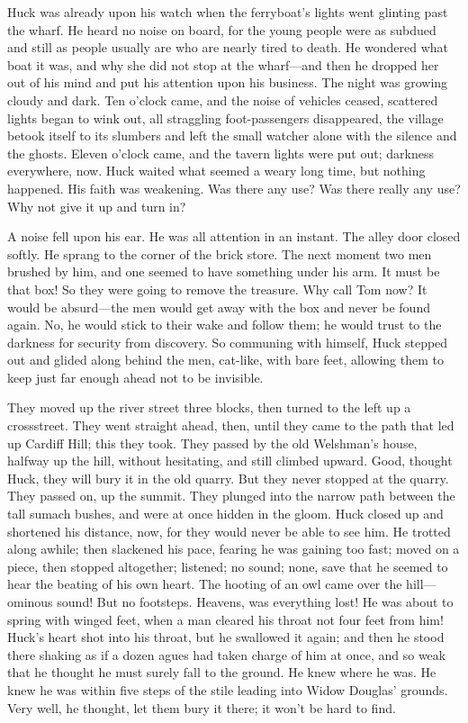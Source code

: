 \documentclass{book}
\begin{document}
Huck was already upon his watch when the ferryboat’s lights went glinting past the wharf. He heard no noise on board, for the young people were as subdued and still as people usually are who are nearly tired to death. He wondered what boat it was, and why she did not stop at the wharf—and then he dropped her out of his mind and put his attention upon his business. The night was growing cloudy and dark. Ten o’clock came, and the noise of vehicles ceased, scattered lights began to wink out, all straggling foot-passengers disappeared, the village betook itself to its slumbers and left the small watcher alone with the silence and the ghosts. Eleven o’clock came, and the tavern lights were put out; darkness everywhere, now. Huck waited what seemed a weary long time, but nothing happened. His faith was weakening. Was there any use? Was there really any use? Why not give it up and turn in?

A noise fell upon his ear. He was all attention in an instant. The alley door closed softly. He sprang to the corner of the brick store. The next moment two men brushed by him, and one seemed to have something under his arm. It must be that box! So they were going to remove the treasure. Why call Tom now? It would be absurd—the men would get away with the box and never be found again. No, he would stick to their wake and follow them; he would trust to the darkness for security from discovery. So communing with himself, Huck stepped out and glided along behind the men, cat-like, with bare feet, allowing them to keep just far enough ahead not to be invisible.

They moved up the river street three blocks, then turned to the left up a crossstreet. They went straight ahead, then, until they came to the path that led up Cardiff Hill; this they took. They passed by the old Welshman’s house, halfway up the hill, without hesitating, and still climbed upward. Good, thought Huck, they will bury it in the old quarry. But they never stopped at the quarry. They passed on, up the summit. They plunged into the narrow path between the tall sumach bushes, and were at once hidden in the gloom. Huck closed up and shortened his distance, now, for they would never be able to see him. He trotted along awhile; then slackened his pace, fearing he was gaining too fast; moved on a piece, then stopped altogether; listened; no sound; none, save that he seemed to hear the beating of his own heart. The hooting of an owl came over the hill—ominous sound! But no footsteps. Heavens, was everything lost! He was about to spring with winged feet, when a man cleared his throat not four feet from him! Huck’s heart shot into his throat, but he swallowed it again; and then he stood there shaking as if a dozen agues had taken charge of him at once, and so weak that he thought he must surely fall to the ground. He knew where he was. He knew he was within five steps of the stile leading into Widow Douglas’ grounds. Very well, he thought, let them bury it there; it won’t be hard to find.
\end{document}
